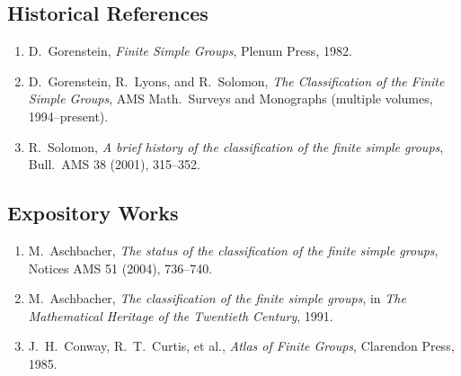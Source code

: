 \subsection*{Historical References}
\begin{enumerate}
    \item D.\ Gorenstein, \textit{Finite Simple Groups}, Plenum Press, 1982.
    \item D.\ Gorenstein, R.\ Lyons, and R.\ Solomon, \textit{The Classification of the Finite Simple Groups}, AMS Math.\ Surveys and Monographs (multiple volumes, 1994--present).
    \item R.\ Solomon, \textit{A brief history of the classification of the finite simple groups}, Bull.\ AMS 38 (2001), 315--352.
\end{enumerate}

\subsection*{Expository Works}
\begin{enumerate}
    \item M.\ Aschbacher, \textit{The status of the classification of the finite simple groups}, Notices AMS 51 (2004), 736--740.
    \item M.\ Aschbacher, \textit{The classification of the finite simple groups}, in \textit{The Mathematical Heritage of the Twentieth Century}, 1991.
    \item J.\ H.\ Conway, R.\ T.\ Curtis, et al., \textit{Atlas of Finite Groups}, Clarendon Press, 1985.
\end{enumerate}

